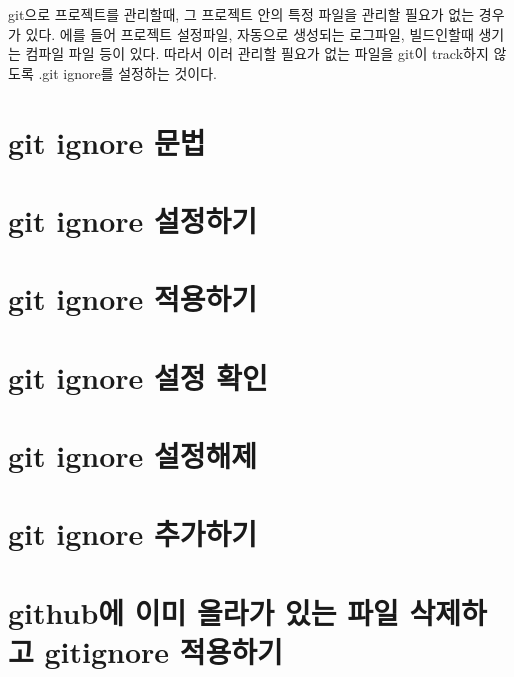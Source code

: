 \documentclass[12pt, a4paper, oneside]{book}
\let\stdsection\section
\renewcommand\section{\newpage\stdsection}
\begin{document}
git으로 프로젝트를 관리할때, 그 프로젝트 안의 특정 파일을 관리할 필요가 없는 경우가 있다.
에를 들어 프로젝트 설정파일, 자동으로 생성되는 로그파일, 빌드인할때 생기는 컴파일 파일 등이 있다.
따라서 이러 관리할 필요가 없는 파일을 git이 track하지 않도록 .git ignore를 설정하는 것이다.



	\section{git ignore 문법}



	\section{git ignore 설정하기}

	\section{git ignore 적용하기}

	\section{git ignore 설정 확인}

	\section{git ignore 설정해제}

	\section{git ignore 추가하기}

	\section{github에 이미 올라가 있는 파일 삭제하고 gitignore 적용하기}
\end{document}
